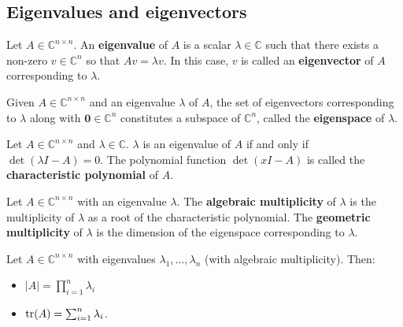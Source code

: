 \documentclass{bareminimum}
\begin{document}
	
	\subsection{Eigenvalues and eigenvectors}
	
	
	\begin{defn}
		Let $A \in \mathbb{C}^{n \times n}$.  An \textbf{eigenvalue} of $A$ is a scalar $\lambda \in \mathbb{C}$ such that there exists a non-zero $v \in \mathbb{C}^n$ so that $Av = \lambda v$. In this case, $v$ is called an \textbf{eigenvector} of $A$ corresponding to $\lambda$.
	\end{defn}
	
	\begin{prop}[Eigenspace]
		Given $A \in \mathbb{C}^{n \times n}$ and an eigenvalue $\lambda$ of $A$, the set of eigenvectors corresponding to $\lambda$ along with $\mathbf{0} \in \mathbb{C}^n$ constitutes a subspace of $\mathbb{C}^{n}$, called the \textbf{eigenspace} of $\lambda$.
	\end{prop}
	
	\begin{prop}
		Let $A \in \mathbb{C}^{n \times n}$ and $\lambda \in \mathbb{C}$. $\lambda$ is an eigenvalue of $A$ if and only if $\det(\lambda I - A) = 0$. The polynomial function $\det(x I - A)$ is called the \textbf{characteristic polynomial} of $A$.
	\end{prop}
	
	\begin{defn} 
		Let $A \in \mathbb{C}^{n \times n}$  with an eigenvalue $\lambda$. The \textbf{algebraic multiplicity} of $\lambda$ is the multiplicity of $\lambda$ as a root of the characteristic polynomial. The \textbf{geometric multiplicity} of $\lambda$ is the dimension of the eigenspace corresponding to $\lambda$.
	\end{defn}
	
	\begin{prop}
		Let $A \in \mathbb{C}^{n \times n}$ with eigenvalues $\lambda_1, \ldots, \lambda_n$ (with algebraic multiplicity). Then:
		\begin{itemize}
			\item $|A| = \prod_{i = 1}^n \lambda_i$
			\item $\operatorname{tr}(A) = \sum_{i = 1}^n \lambda_i$.
		\end{itemize}
	\end{prop}
	
\end{document}
